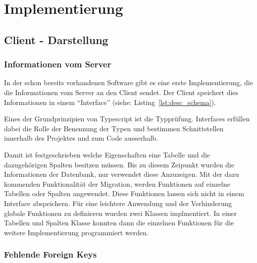 \section{Implementierung}
\label{sec:implementierung}

%

\subsection{Client - Darstellung}
\label{subsec04:client_viz}

%

\subsubsection{Informationen vom Server}
\label{subsubsec04:info_server}

In der schon bereits vorhandenen Software gibt es eine erste Implementierung, die die Informationen vom Server an den Client sendet.
Der Client speichert dies Informationen in einem ``Interface'' (siehe: Listing~\ref{lst:desc_schema}). 



Eines der Grundprinzipien von Typescript ist die Typprüfung. Interfaces erfüllen dabei die Rolle der Benennung der Typen und bestimmen Schnittstellen innerhalb des Projektes und zum Code ausserhalb.~\cite{typescript_interfaces}

Damit ist festgeschrieben welche Eigenschaften eine Tabelle und die dazugehörigen Spalten besitzen müssen. Bis zu diesem Zeipunkt wurden die Informationen der Datenbank, nur verwendet diese Anzuzeigen. Mit der dazu kommenden Funktionalität der Migration, werden Funktionen auf einzelne Tabellen oder Spalten angewendet. Diese Funktionen lassen sich nicht in einem Interface abspeichern. Für eine leichtere Anwendung und der Verhinderung globale Funktionen zu definieren wurden zwei Klassen implmentiert. In einer Tabellen und Spalten Klasse konnten dann die einzelnen Funktionen für die weitere Implementierung programmiert werden.


\subsubsection{Fehlende Foreign Keys}
\label{subsubsec04:miss_fk}

